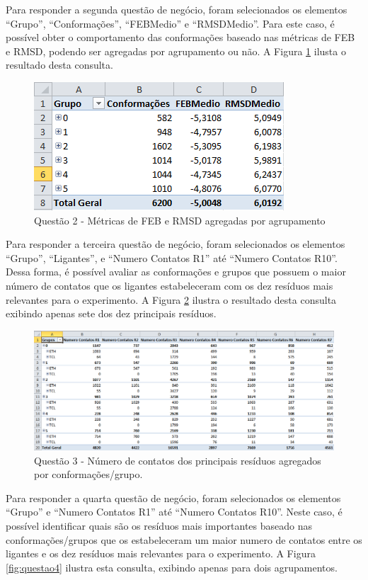 Para responder a segunda questão de negócio, foram selecionados os elementos ``Grupo'', ``Conformações'', ``FEBMedio'' e ``RMSDMedio''. Para este caso, é possível obter o comportamento das conformações baseado nas métricas de FEB e RMSD, podendo ser agregadas por agrupamento ou não. A Figura \ref{fig:questao2} ilusta o resultado desta consulta.

\begin{figure}[h]
        \center
        \includegraphics[scale=0.8]{images/Questao2.PNG}
        \caption{Questão 2 - Métricas de FEB e RMSD agregadas por agrupamento}
        \label{fig:questao2}
\end{figure}

Para responder a terceira questão de negócio, foram selecionados os elementos ``Grupo'', ``Ligantes'', e ``Numero Contatos R1'' até ``Numero Contatos R10''. Dessa forma, é possível avaliar as conformações e grupos que possuem o maior número de contatos que os ligantes estabeleceram com os dez resíduos mais relevantes para o experimento. A Figura \ref{fig:questao3} ilustra o resultado desta consulta exibindo apenas sete dos dez principais resíduos.

\begin{figure}[h]
        \center
        \includegraphics[scale=0.58]{images/Questao3.PNG}
        \caption{Questão 3 - Número de contatos dos principais resíduos agregados por conformações/grupo.}
        \label{fig:questao3}
\end{figure}

Para responder a quarta questão de negócio, foram selecionados os elementos ``Grupo'' e ``Numero Contatos R1'' até ``Numero Contatos R10''. Neste caso, é possível identificar quais são os resíduos mais importantes baseado nas conformações/grupos que os estabeleceram um maior numero de contatos entre os ligantes e os dez resíduos mais relevantes para o experimento. A Figura \ref{fig:questao4} ilustra esta consulta, exibindo apenas para dois agrupamentos. 


